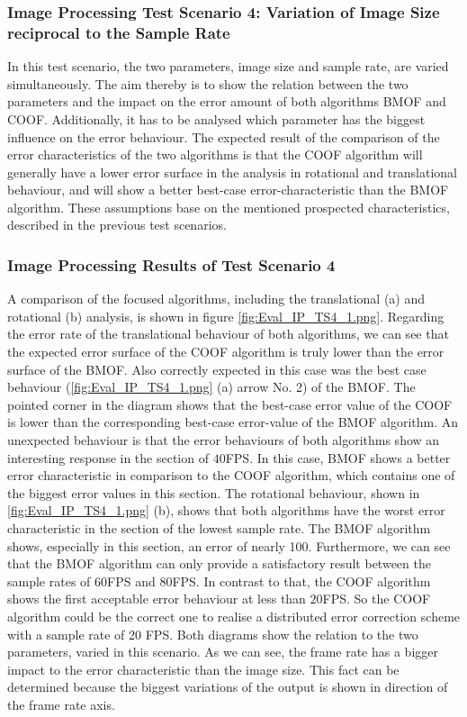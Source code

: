 \subsubsection{Image Processing Test Scenario 4: Variation of Image Size reciprocal to the Sample Rate}
In this test scenario, the two parameters, image size and sample rate, are varied simultaneously. The aim thereby is to show the relation between the two parameters and the impact on the error amount of both algorithms \gls{BMOF} and \gls{COOF}. Additionally, it has to be analysed which parameter has the biggest influence on the error behaviour. The expected result of the comparison of the error characteristics of the two algorithms is that the \gls{COOF} algorithm will generally have a lower error surface in the analysis in rotational and translational behaviour, and will show a better best-case error-characteristic than the \gls{BMOF} algorithm. These assumptions base on the mentioned prospected characteristics, described in the previous test scenarios.

\subsubsection{Image Processing Results of Test Scenario 4}
A comparison of the focused algorithms, including the translational (a) and rotational (b) analysis, is shown in figure 
\ref{fig:Eval_IP_TS4_1.png}. Regarding the error rate of the translational behaviour of both algorithms, we can see that the expected error surface of the \gls{COOF} algorithm is truly lower than the error surface of the \gls{BMOF}. Also correctly expected in this case was the best case behaviour (\ref{fig:Eval_IP_TS4_1.png} (a) arrow No. 2) of the \gls{BMOF}. The pointed corner in the diagram shows that the best-case error value of the \gls{COOF} is lower than the corresponding best-case error-value of the \gls{BMOF} algorithm. An unexpected behaviour is that the error behaviours of both algorithms show an interesting response in the section of \ensuremath{40}\gls{FPS}. In this case, \gls{BMOF} shows a better error characteristic in comparison to the \gls{COOF} algorithm, which contains one of the biggest error values in this section.
The rotational behaviour, shown in \ref{fig:Eval_IP_TS4_1.png} (b), shows that both algorithms have the worst error characteristic in the section of the lowest sample rate. The \gls{BMOF} algorithm shows, especially in this section, an error of nearly 100\text{\%}. Furthermore, we can see that the \gls{BMOF} algorithm can only provide a satisfactory result between the sample rates of \ensuremath{60}\gls{FPS} and \ensuremath{80}\gls{FPS}. In contrast to that, the \gls{COOF} algorithm shows the first acceptable error behaviour at less than \ensuremath{20}\gls{FPS}. So the \gls{COOF} algorithm could be the correct one to realise a distributed error correction scheme with a sample rate of 20 \gls{FPS}.
Both diagrams show the relation to the two parameters, varied in this scenario. As we can see, the frame rate has a bigger impact to the error characteristic than the image size. This fact can be determined because the biggest variations of the output is shown in direction of the frame rate axis.

